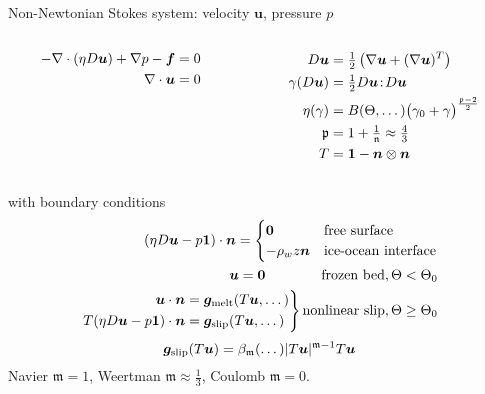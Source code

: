 \begin{frame}{Non-Newtonian Stokes system: velocity $\bm u$, pressure $p$}
\begin{columns}
\begin{column}{0.5\textwidth}
  \alert{\begin{align*}
    -\nabla \cdot(\eta D\bm u) + \nabla p - \bm f &= 0 \\
    \nabla \cdot \bm u &= 0
  \end{align*}}
\end{column}
\begin{column}{0.5\textwidth}
    \begin{align*}
      D\bm u &= \tfrac 1 2 \left(\nabla \bm u + (\nabla \bm u)^T \right) \\
      \gamma(D\bm u) &= \tfrac 1 2 D\bm u \!:\! D\bm u \\
      \eta(\gamma) &= B(\Theta,\dotsc)\big(\gamma_0 + \gamma \big)^{\frac{\mathfrak{p}-2}{2}} \\
      \mathfrak{p} &= 1 + \tfrac{1}{\mathfrak{n}} \approx \tfrac 4 3 \\
      T &= \bm 1 - \bm n \otimes \bm n \\
    \end{align*}
\end{column}
\end{columns}
\vspace{-1.5em}
    with boundary conditions
    \begin{align*}
      (\eta D\bm u - p\bm 1)\cdot\bm n =
      \begin{cases}\bm 0 & \text{free surface} \\
        -\rho_w z \bm n & \text{ice-ocean interface}\end{cases} \\
      \bm u = \bm 0\qquad\qquad \text{frozen bed}, \Theta < \Theta_0 \\
      \left. \begin{aligned}
          \bm u \cdot \bm n &= \bm g_{\text{melt}}(T\bm u,\dotsc) \\
          T (\eta D\bm u - p\bm 1)\cdot\bm n &= \bm g_{\text{slip}}(T \bm u,\dotsc) \end{aligned}\right\}
      \text{nonlinear slip}, \Theta \ge \Theta_0 \\
    \end{align*}
    \vspace{-3em}
    \[ \bm g_{\text{slip}}(T\bm u) = \beta_{\mathfrak{m}}(\dotsc) \lvert T\bm u \rvert^{\mathfrak{m}-1} T \bm u \]
    Navier $\mathfrak{m}=1$, \quad Weertman $\mathfrak{m}\approx \frac 1 3$, \quad Coulomb $\mathfrak{m}=0$.
\end{frame}

